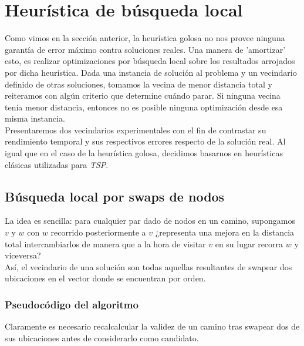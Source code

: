 \section{Heurística de búsqueda local}
Como vimos en la sección anterior, la heurística golosa no nos provee ninguna garantía de error máximo contra soluciones reales. Una manera de 'amortizar' esto, es realizar optimizaciones por búsqueda local sobre los resultados arrojados por dicha heurística. Dada una instancia de solución al problema y un vecindario definido de otras soluciones, tomamos la vecina de menor distancia total y reiteramos con algún criterio que determine cuándo parar. Si ninguna vecina tenía menor distancia, entonces no es posible ninguna optimización desde esa misma instancia.
\\

Presentaremos dos vecindarios experimentales con el fin de contrastar su rendimiento temporal y sus respectivos errores respecto de la solución real. Al igual que en el caso de la heurística golosa, decidimos basarnos en heurísticas clásicas utilizadas para \emph{TSP}.

\subsection{Búsqueda local por swaps de nodos}
La idea es sencilla: para cualquier par dado de nodos en un camino, supongamos $v$ y $w$ con $w$ recorrido posteriormente a $v$ ¿representa una mejora en la distancia total intercambiarlos de manera que a la hora de visitar $v$ en su lugar recorra $w$ y viceversa?
\\

Así, el vecindario de una solución son todas aquellas resultantes de swapear dos ubicaciones en el vector donde se encuentran por orden.

\subsubsection{Pseudocódigo del algoritmo}

Claramente es necesario recalcalcular la validez de un camino tras swapear dos de sus ubicaciones antes de considerarlo como candidato.

